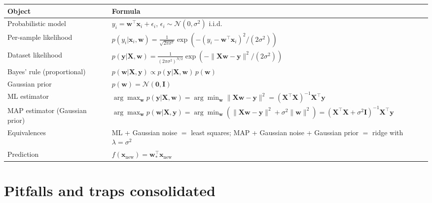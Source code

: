 \documentclass[11pt, a4paper]{article}
\newcommand{\thead}[1]{\textbf{#1}}
\begin{document}
\begin{tabularx}{\linewidth}{@{}lX@{}}
\toprule
\thead{Object} & \thead{Formula} \\
\midrule
Probabilistic model       & $y_i = \mathbf{w}^\top\mathbf{x}_i + \epsilon_i$, $\epsilon_i\sim\mathcal{N}(0,\sigma^2)$ i.i.d. \\
Per-sample likelihood     & $p(y_i|\mathbf{x}_i,\mathbf{w}) = \frac{1}{\sqrt{2\pi\sigma^2}}\exp(-(y_i-\mathbf{w}^\top\mathbf{x}_i)^2/(2\sigma^2))$ \\
Dataset likelihood        & $p(\mathbf{y}|\mathbf{X},\mathbf{w}) = \frac{1}{(2\pi\sigma^2)^{N/2}}\exp(-\|\mathbf{X}\mathbf{w}-\mathbf{y}\|^2/(2\sigma^2))$ \\
Bayes' rule (proportional)& $p(\mathbf{w}|\mathbf{X},\mathbf{y}) \propto p(\mathbf{y}|\mathbf{X},\mathbf{w})\,p(\mathbf{w})$ \\
Gaussian prior            & $p(\mathbf{w}) = \mathcal{N}(\mathbf{0},\mathbf{I})$ \\
ML estimator              & $\arg\max_\mathbf{w} p(\mathbf{y}|\mathbf{X},\mathbf{w}) = \arg\min_\mathbf{w}\|\mathbf{X}\mathbf{w}-\mathbf{y}\|^2 = (\mathbf{X}^\top\mathbf{X})^{-1}\mathbf{X}^\top\mathbf{y}$ \\
MAP estimator (Gaussian prior) & $\arg\max_\mathbf{w} p(\mathbf{w}|\mathbf{X},\mathbf{y}) = \arg\min_\mathbf{w}(\|\mathbf{X}\mathbf{w}-\mathbf{y}\|^2 + \sigma^2\|\mathbf{w}\|^2) = (\mathbf{X}^\top\mathbf{X}+\sigma^2\mathbf{I})^{-1}\mathbf{X}^\top\mathbf{y}$ \\
Equivalences              & ML + Gaussian noise $=$ least squares; MAP + Gaussian noise + Gaussian prior $=$ ridge with $\lambda=\sigma^2$ \\
Prediction                & $f(\mathbf{x}_{\text{new}}) = \mathbf{w}_*^\top\mathbf{x}_{\text{new}}$ \\
\bottomrule
\end{tabularx}

\section*{Pitfalls and traps consolidated}
\end{document}
